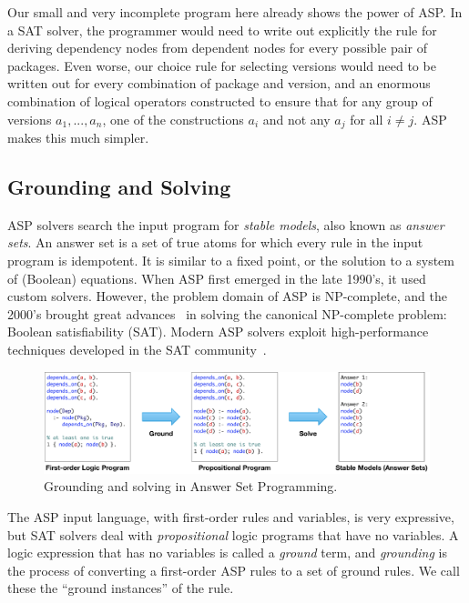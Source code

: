 Our small and very incomplete program here already shows the power of ASP. In a SAT
solver, the programmer would need to write out explicitly the rule for deriving
dependency nodes from dependent nodes for every possible pair of packages. Even worse,
our choice rule for selecting versions would need to be written out for every
combination of package and version, and an enormous combination of logical operators
constructed to ensure that for any group of versions \texttt{$a_1, ..., a_n$}, one of
the constructions \texttt{$a_i$} and not any \texttt{$a_j$} for all $i\neq{j}$. ASP
makes this much simpler.


\subsection{Grounding and Solving}

ASP solvers search the input program for {\it stable models}, also known as
\textit{answer sets}. An answer set is a set of true atoms for which every rule in the
input program is idempotent. It is similar to a fixed point, or the solution to a system
of (Boolean) equations. When ASP first emerged in the late 1990's, it used custom solvers.
However, the problem domain of ASP is NP-complete, and the 2000's brought great
advances~\cite{moskewicz2001chaff} in solving the canonical NP-complete problem: Boolean
satisfiability (SAT). Modern ASP solvers exploit high-performance techniques developed
in the SAT community~\cite{gebser+:asp-book}.

\begin{figure}[t]
  \centering
  \includegraphics[width=.8\textwidth]{figures/asp-grounding.pdf}
  \caption{
    Grounding and solving in Answer Set Programming.
    \label{fig:ground-solve}
    \vspace{-1em}
  }
\end{figure}

The ASP input language, with first-order rules and variables, is very expressive, but
SAT solvers deal with {\it propositional} logic programs that have no variables. A logic
expression that has no variables is called a {\it ground} term, and {\it grounding} is
the process of converting a first-order ASP rules to a set of ground rules. We call
these the ``ground instances'' of the rule.

